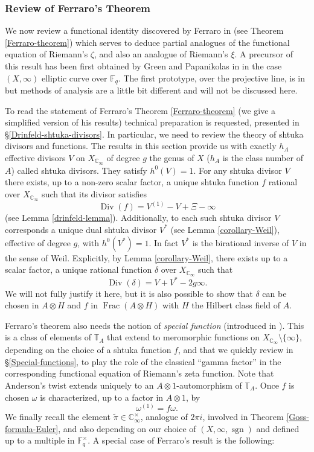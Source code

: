 \documentclass[11pt]{amsart}
\numberwithin{equation}{section}
\newcommand{\Div}{\operatorname{Div}}
\newcommand{\FF}{\mathbb{F}}
\newcommand{\CC}{\mathbb{C}}
\newcommand{\TT}{\mathbb{T}}
\newcommand{\sgn}{\operatorname{sgn}}
\begin{document}
\subsubsection{Review of Ferraro's Theorem}
We now review a functional identity discovered by Ferraro in \cite{FER1,FER2} (see Theorem \ref{Ferraro-theorem}) which  serves to deduce partial analogues of the functional equation of Riemann's $\zeta$, and also an analogue of Riemann's $\xi$. A precursor of this result has been first obtained by Green and Papanikolas in \cite{GRE&PAP} in the 
case $(X,\infty)$ elliptic curve over $\FF_q$. The first prototype, over the projective line, is in \cite{PEL} but methods of analysis are a little bit different and will not be discussed here.

To read the statement of Ferraro's Theorem \ref{Ferraro-theorem} (we give a simplified version of his results) technical preparation is requested, presented in \S \ref{Drinfeld-shtuka-divisors}. In particular, we need to review the theory of shtuka divisors and functions. The results in this section provide us with exactly $h_A$ effective divisors 
$V$ on $X_{\CC_\infty}$ of degree $g$ the genus of $X$ ($h_A$ is the class number of $A$) called shtuka divisors. They satisfy 
$h^0(V)=1$. For any shtuka divisor $V$ there exists, up to a non-zero scalar factor, a unique shtuka function
$f$ rational over $X_{\CC_\infty}$ such that its divisor satisfies
$$\Div(f)=V^{(1)}-V+\Xi-\infty$$  (see Lemma \ref{drinfeld-lemma}). 
Additionally, to each such shtuka divisor $V$ corresponds a unique dual shtuka divisor $V^*$ (see Lemma \ref{corollary-Weil}), effective of degree $g$, with $h^0(V^*)=1$. In fact $V^*$ is the birational inverse of $V$ in the sense of Weil. Explicitly, by Lemma \ref{corollary-Weil}, there exists up to a scalar factor, a unique rational function $\delta$ over $X_{\CC_\infty}$ such that 
$$\Div(\delta)=V+V^*-2g\infty.$$
We will not fully justify it here, but it is also possible to show that $\delta$ can be chosen in $A\otimes H$ and $f$ in 
$\operatorname{Frac}(A\otimes H)$ with $H$ the Hilbert class field of $A$.

Ferraro's theorem also needs the notion of {\em special function} (introduced in \cite{ANG&NGO&TAV1}). This is a class of elements of $\TT_A$ that extend to meromorphic functions on $X_{\CC_\infty}\setminus\{\infty\}$, depending on the choice of a shtuka function $f$, and that we quickly review in \S \ref{Special-functions}, to play the role of the classical ``gamma factor'' in the corresponding functional equation of Riemann's zeta function. Note that Anderson's twist extends uniquely to an $A\otimes1$-automorphism of $\TT_A$.
Once $f$ is chosen $\omega$ is characterized, up to a factor in $A\otimes1$, by 
$$\omega^{(1)}=f\omega.$$
We finally recall the element $\widetilde{\pi}\in\CC_\infty^\times$, analogue of $2\pi i$, involved in Theorem \ref{Goss-formula-Euler}, and also depending on our choice of $(X,\infty,\sgn)$ and defined up to a multiple in $\FF_q^\times$.
A special case of Ferraro's result is the following: 
\end{document}
